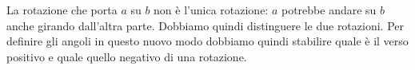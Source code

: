  \begin{minipage}[t]{.45\textwidth}
\begin{inaccessibleblock}
\begin{center}
 
\end{center}
\end{inaccessibleblock}
 \end{minipage}
 \begin{minipage}[t]{.45\textwidth}
\begin{inaccessibleblock}
\begin{center}
 
\end{center}
\end{inaccessibleblock}
 \end{minipage}

La rotazione che porta \(a\) su \(b\)  non è 
l'unica rotazione: \(a\) potrebbe andare su \(b\) anche girando dall'altra 
parte. Dobbiamo quindi distinguere le due 
rotazioni.
Per definire gli angoli in questo nuovo modo dobbiamo quindi stabilire quale 
è il verso positivo e quale quello negativo di una rotazione.

%     

